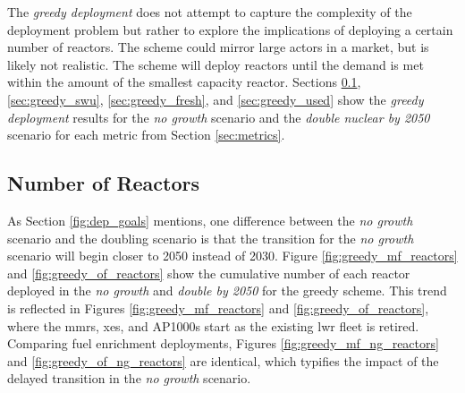
The \textit{greedy deployment} does not attempt to capture the complexity of the deployment problem but rather to explore the implications of deploying a certain number of reactors. The scheme could mirror large actors in a market, but is likely not realistic. The scheme will deploy reactors until the demand is met within the amount of the smallest capacity reactor. Sections \ref{sec:greedy_reactors}, \ref{sec:greedy_swu}, \ref{sec:greedy_fresh}, and \ref{sec:greedy_used} show the \textit{greedy deployment} results for the \textit{no growth} scenario and the \textit{double nuclear by 2050} scenario for each metric from Section \ref{sec:metrics}.

\subsection{Number of Reactors}
\label{sec:greedy_reactors}

As Section \ref{fig:dep_goals} mentions, one difference between the \textit{no growth} scenario and the doubling scenario is that the transition for the \textit{no growth} scenario will begin closer to 2050 instead of 2030. Figure \ref{fig:greedy_mf_reactors} and \ref{fig:greedy_of_reactors} show the cumulative number of each reactor deployed in the \textit{no growth} and \textit{double by 2050} for the greedy scheme. This trend is reflected in Figures \ref{fig:greedy_mf_reactors} and \ref{fig:greedy_of_reactors}, where the \glspl{mmr}, \glspl{xe}, and AP1000s start as the existing \gls{lwr} fleet is retired. Comparing fuel enrichment deployments, Figures \ref{fig:greedy_mf_ng_reactors} and \ref{fig:greedy_of_ng_reactors} are identical, which typifies the impact of the delayed transition in the \textit{no growth} scenario.


